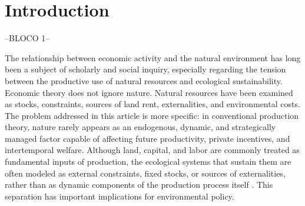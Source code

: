 \section{Introduction}








--BLOCO 1--

The relationship between economic activity and the natural environment has long been a subject of scholarly and social inquiry, especially regarding the tension between the productive use of natural resources and ecological sustainability. Economic theory does not ignore nature. Natural resources have been examined as stocks, constraints, sources of land rent, externalities, and environmental costs. The problem addressed in this article is more specific: in conventional production theory, nature rarely appears as an endogenous, dynamic, and strategically managed factor capable of affecting future productivity, private incentives, and intertemporal welfare. Although land, capital, and labor are commonly treated as fundamental inputs of production, the ecological systems that sustain them are often modeled as external constraints, fixed stocks, or sources of externalities, rather than as dynamic components of the production process itself \cite{jehle2011, stiglitz1989reflections, dasgupta2001human}. This separation has important implications for environmental policy. 

